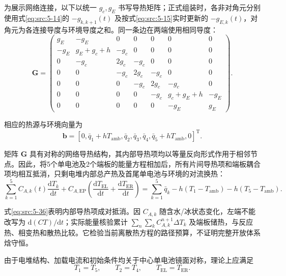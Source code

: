 \documentclass[bwprint]{gmcmthesis}
\numberwithin{equation}{section}
\numberwithin{figure}{section}
\begin{document}
为展示网络连接，以下以统一 $g_c,g_E$ 书写导热矩阵；正式组装时，各非对角元分别使用式\eqref{eq:src:5-14}的 $-g_{k,k+1}(t)$ 及按式\eqref{eq:src:5-15}实时更新的 $-g_{E,k}(t)$，对角元为各连接导度与环境导度之和。同一条边在两端使用相同导度：
\begin{equation}
\mathbf{G} = \begin{pmatrix}
g_E & -g_E & 0 & 0 & 0 & 0 & 0 \\
-g_E & g_E + g_c + h & -g_c & 0 & 0 & 0 & 0 \\
0 & -g_c & 2g_c & -g_c & 0 & 0 & 0 \\
0 & 0 & -g_c & 2g_c & -g_c & 0 & 0 \\
0 & 0 & 0 & -g_c & 2g_c & -g_c & 0 \\
0 & 0 & 0 & 0 & -g_c & g_c + g_E + h & -g_E \\
0 & 0 & 0 & 0 & 0 & -g_E & g_E
\end{pmatrix}. \label{eq:src:5-34}
\end{equation}

 相应的热源与环境向量为
\begin{equation}
\mathbf{b} = [0, \bar{q}_1 + hT_{\text{amb}}, \bar{q}_2, \bar{q}_3, \bar{q}_4, \bar{q}_5 + hT_{\text{amb}}, 0]^{\text{T}}. \label{eq:src:5-35}
\end{equation}

 矩阵 \(\mathbf{G}\) 具有对称的网络导热结构，其内部导热项均以等量反向形式作用于相邻节点。因此，将5个单电池及2个端板的能量方程相加后，所有片间导热项和端板耦合项均相互抵消，只剩电堆内部总产热及首尾单电池与环境的对流换热：
\begin{equation}
\sum_{k=1}^5 C_{A,k}(t)\frac{\mathrm dT_k}{\mathrm dt}+C_{A,\text{EP}}\left(\frac{\mathrm dT_{\text{EL}}}{\mathrm dt}+\frac{\mathrm dT_{\text{ER}}}{\mathrm dt}\right) = \sum_{k=1}^5 \bar{q}_k - h(T_1 - T_{\text{amb}}) - h(T_5 - T_{\text{amb}}). \label{eq:src:5-36}
\end{equation}

式\eqref{eq:src:5-36}表明内部导热项成对抵消。因 $C_{A,k}$ 随含水/冰状态变化，左端不能改写为 $\mathrm d(CT)/\mathrm dt$；实际能量核验累计 $\sum_n\sum_k C_{A,k}^{n+1}\Delta T_k$ 及端板储热，与反应热、相变热和散热比较。它检验当前离散热方程的路径预算，不证明完整开放体系焓守恒。

 由于电堆结构、加载电流和初始条件均关于中心单电池镜面对称，理论上应满足
\begin{equation}
T_1 = T_5, \qquad T_2 = T_4, \qquad T_{\text{EL}} = T_{\text{ER}}. \label{eq:src:5-37}
\end{equation}
\end{document}
